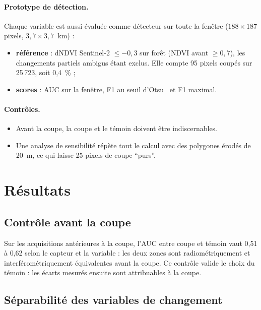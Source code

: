 \documentclass[11pt,a4paper]{article}
\begin{document}
\paragraph{Prototype de détection.} Chaque variable est aussi évaluée comme détecteur sur toute la fenêtre
($188\times187$ pixels, $3{,}7\times3{,}7$~km) :
\begin{itemize}
\item \textbf{référence} : dNDVI Sentinel-2 $\leq -0{,}3$ sur forêt (NDVI avant $\geq 0{,}7$), les changements
  partiels ambigus étant exclus. Elle compte 95 pixels coupés sur 25\,723, soit 0,4~\% ;
\item \textbf{scores} : AUC sur la fenêtre, F1 au seuil d'Otsu~\cite{otsu1979threshold} et F1 maximal.
\end{itemize}

\paragraph{Contrôles.}
\begin{itemize}
\item Avant la coupe, la coupe et le témoin doivent être indiscernables.
\item Une analyse de sensibilité répète tout le calcul avec des polygones érodés de 20~m, ce qui laisse 25 pixels
  de coupe \enquote{purs}.
\end{itemize}

\section{Résultats}

\subsection{Contrôle avant la coupe}

Sur les acquisitions antérieures à la coupe, l'AUC entre coupe et témoin vaut 0,51 à 0,62 selon le capteur et la
variable : les deux zones sont radiométriquement et interférométriquement équivalentes avant la coupe. Ce contrôle
valide le choix du témoin : les écarts mesurés ensuite sont attribuables à la coupe.

\subsection{Séparabilité des variables de changement}
\end{document}

